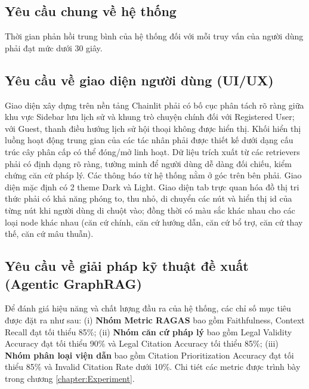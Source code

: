 \documentclass[../DoAn.tex]{subfiles}
\begin{document}
\subsection{Yêu cầu chung về hệ thống}
Thời gian phản hồi trung bình của hệ thống đối với mỗi truy vấn của người dùng phải đạt mức dưới 30 giây.
\subsection{Yêu cầu về giao diện người dùng (UI/UX)}
\label{subsection:2.4.2}
Giao diện xây dựng trên nền tảng Chainlit phải có bố cục phân tách rõ ràng giữa khu vực Sidebar lưu lịch sử và khung trò chuyện chính đối với Registered User; với Guest, thanh điều hướng lịch sử hội thoại không được hiển thị. Khối hiển thị luồng hoạt động trung gian của các tác nhân phải được thiết kế dưới dạng cấu trúc cây phân cấp có thể đóng/mở linh hoạt. Dữ liệu trích xuất từ các retrievers phải có định dạng rõ ràng, tường minh để người dùng dễ dàng đối chiếu, kiểm chứng căn cứ pháp lý. Các thông báo từ hệ thống nằm ở góc trên bên phải. Giao diện mặc định có 2 theme Dark và Light. Giao diện tab trực quan hóa đồ thị tri thức phải có khả năng phóng to, thu nhỏ, di chuyển các nút và hiển thị id của từng nút khi người dùng di chuột vào; đồng thời có màu sắc khác nhau cho các loại node khác nhau (căn cứ chính, căn cứ hướng dẫn, căn cứ bổ trợ, căn cứ thay thế, căn cứ mâu thuẫn).
\subsection{Yêu cầu về giải pháp kỹ thuật đề xuất (Agentic GraphRAG)}
\label{subsection:2.4.3}
Để đánh giá hiệu năng và chất lượng đầu ra của hệ thống, các chỉ số mục tiêu được đặt ra như sau: (i) \textbf{Nhóm Metric RAGAS} bao gồm Faithfulness, Context Recall đạt tối thiểu 85\%; (ii) \textbf{Nhóm căn cứ pháp lý} bao gồm Legal Validity Accuracy đạt tối thiểu 90\% và Legal Citation Accuracy tối thiểu 85\%; (iii) \textbf{Nhóm phân loại viện dẫn} bao gồm Citation Prioritization Accuracy đạt tối thiểu 85\% và Invalid Citation Rate dưới 10\%. Chi tiét các metric được trình bày trong chương \ref{chapter:Experiment}.
\end{document}
